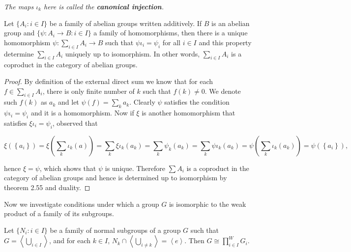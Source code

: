 \begin{note}\em
The maps $\iota_k$ here is called the \textbf{canonical injection}.
\end{note}
\begin{theorem}
Let $\{A_i:i\in I\}$ be a family of abelian groups written additively. If $B$ is an abelian group and $\{\psi:A_i\to B:i\in I\}$ a family of homomorphisms, then there is a unique homomorphism $\psi:\sum_{i\in I}A_i\to B$ such that $\psi\iota_i=\psi_i$ for all $i\in I$ and this property determine $\sum_{i\in I}A_i$ uniquely up to isomorphism. In other words, $\sum_{i\in I}A_i$ is a coproduct in the category of abelian groups.
\end{theorem}
\begin{proof}
By definition of the external direct sum we know that for each $f\in\sum_{i\in I}A_i$, there is only finite number of $k$ such that $f(k)\ne 0$. We denote such $f(k)$ as $a_k$ and let $\psi(f)=\sum_{k}a_k$. Clearly $\psi$ satisfies the condition $\psi\iota_i=\psi_i$ and it is a homomorphism. Now if $\xi$ is another homomorphism that satisfies $\xi\iota_i=\psi_i$, observed that 
\begin{small}
$$
\xi \left( \left\{ a_i \right\} \right) =\xi \left( \sum_k{\iota _k\left( a \right)} \right) =\sum_k{\xi \iota _k\left( a_k \right)}=\sum_k{\psi _k\left( a_k \right)}=\sum_k{\psi \iota _k\left( a_k \right)}=\psi \left( \sum_k{\iota _k\left( a_k \right)} \right) =\psi \left( \left\{ a_i \right\} \right) ,
$$
\end{small}
hence $\xi=\psi$, which shows that $\psi$ is unique. Therefore $\sum A_i$ is a coproduct in the category of abelian groups and hence is determined up to isomorphism by theorem 2.55 and duality.
\end{proof}
Now we investigate conditions under which a group $G$ is isomorphic to the weak product of a family of its subgroups.
\begin{theorem}
Let $\{N_i:i\in I\}$ be a family of normal subgroups of a group $G$ such that $G=\left<\bigcup_{i\in I}\right>$, and for each $k\in I$, $N_k\cap\left<\bigcup_{i\ne k}\right>=\left<e\right>$. Then $G\cong{\prod}^W_{i\in I}G_i$.
\end{theorem}
